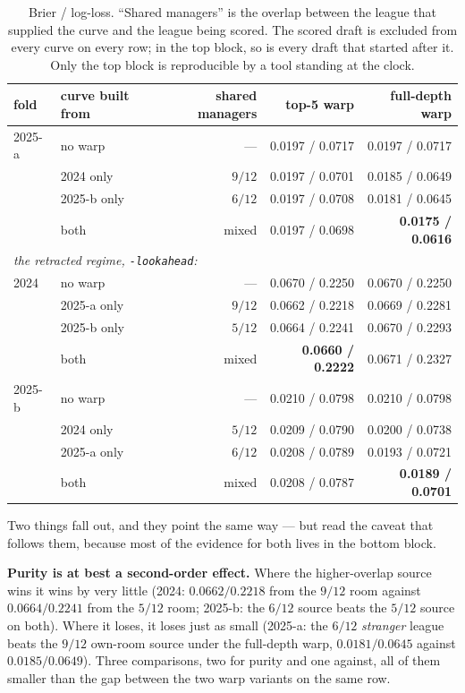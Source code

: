 \documentclass[10pt,a4paper]{article}
\theoremstyle{plain}
\theoremstyle{definition}
\theoremstyle{remark}
\newcommand{\code}[1]{\texttt{\small #1}}
\begin{document}
\begin{table}[htbp]
\centering
\small
\begin{tabular}{llrrr}
\toprule
fold & curve built from & shared managers & top-5 warp & full-depth warp \\
\midrule
2025-a & no warp             & ---    & 0.0197 / 0.0717 & 0.0197 / 0.0717 \\
       & 2024 only           & $9/12$ & 0.0197 / 0.0701 & 0.0185 / 0.0649 \\
       & 2025-b only         & $6/12$ & 0.0197 / 0.0708 & 0.0181 / 0.0645 \\
       & both                & mixed  & 0.0197 / 0.0698 & \textbf{0.0175 / 0.0616} \\
\midrule
\multicolumn{5}{l}{\emph{the retracted regime, \code{-lookahead}:}} \\
2024   & no warp             & ---    & 0.0670 / 0.2250 & 0.0670 / 0.2250 \\
       & 2025-a only         & $9/12$ & 0.0662 / 0.2218 & 0.0669 / 0.2281 \\
       & 2025-b only         & $5/12$ & 0.0664 / 0.2241 & 0.0670 / 0.2293 \\
       & both                & mixed  & \textbf{0.0660 / 0.2222} & 0.0671 / 0.2327 \\
\midrule
2025-b & no warp             & ---    & 0.0210 / 0.0798 & 0.0210 / 0.0798 \\
       & 2024 only           & $5/12$ & 0.0209 / 0.0790 & 0.0200 / 0.0738 \\
       & 2025-a only         & $6/12$ & 0.0208 / 0.0789 & 0.0193 / 0.0721 \\
       & both                & mixed  & 0.0208 / 0.0787 & \textbf{0.0189 / 0.0701} \\
\bottomrule
\end{tabular}
\caption{Brier / log-loss. ``Shared managers'' is the overlap between the league that
supplied the curve and the league being scored. The scored draft is excluded from every
curve on every row; in the top block, so is every draft that started after it. Only the top
block is reproducible by a tool standing at the clock.}
\label{tab:purity}
\end{table}

Two things fall out, and they point the same way --- but read the caveat that follows them,
because most of the evidence for both lives in the bottom block.

\textbf{Purity is at best a second-order effect.} Where the higher-overlap source wins it
wins by very little (2024: $0.0662/0.2218$ from the $9/12$ room against $0.0664/0.2241$
from the $5/12$ room; 2025-b: the $6/12$ source beats the $5/12$ source on both). Where it
loses, it loses just as small (2025-a: the $6/12$ \emph{stranger} league beats the $9/12$
own-room source under the full-depth warp, $0.0181/0.0645$ against $0.0185/0.0649$). Three
comparisons, two for purity and one against, all of them smaller than the gap between the
two warp variants on the same row.
\end{document}
